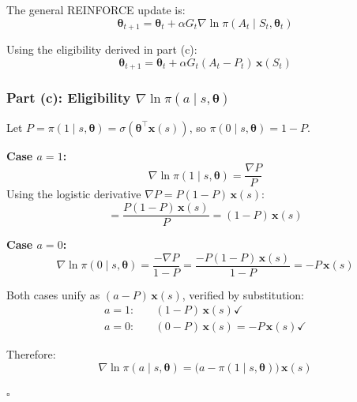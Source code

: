 \documentclass{article}
\begin{document}
The general REINFORCE update is:
\[
\boldsymbol{\theta}_{t+1} = \boldsymbol{\theta}_t + \alpha G_t \nabla \ln \pi(A_t \mid S_t, \boldsymbol{\theta}_t)
\]

Using the eligibility derived in part (c):
\[
\boldsymbol{\theta}_{t+1} = \boldsymbol{\theta}_t + \alpha G_t (A_t - P_t)\,\mathbf{x}(S_t)
\]

\subsubsection*{Part (c): Eligibility $\nabla \ln \pi(a \mid s, \boldsymbol{\theta})$}

Let $P = \pi(1 \mid s, \boldsymbol{\theta}) = \sigma(\boldsymbol{\theta}^\top \mathbf{x}(s))$,
so $\pi(0 \mid s, \boldsymbol{\theta}) = 1 - P$.

\textbf{Case $a = 1$:}
\[
\nabla \ln \pi(1 \mid s, \boldsymbol{\theta})
= \frac{\nabla P}{P}
\]
Using the logistic derivative $\nabla P = P(1-P)\,\mathbf{x}(s)$:
\[
= \frac{P(1-P)\,\mathbf{x}(s)}{P} = (1 - P)\,\mathbf{x}(s)
\]

\textbf{Case $a = 0$:}
\[
\nabla \ln \pi(0 \mid s, \boldsymbol{\theta})
= \frac{-\nabla P}{1 - P}
= \frac{-P(1-P)\,\mathbf{x}(s)}{1-P} = -P\,\mathbf{x}(s)
\]

Both cases unify as $(a - P)\,\mathbf{x}(s)$, verified by substitution:
\begin{align*}
a = 1: &\quad (1 - P)\,\mathbf{x}(s) \checkmark \\
a = 0: &\quad (0 - P)\,\mathbf{x}(s) = -P\,\mathbf{x}(s) \checkmark
\end{align*}

Therefore:
\[
\boxed{\nabla \ln \pi(a \mid s, \boldsymbol{\theta}) = \bigl(a - \pi(1 \mid s, \boldsymbol{\theta})\bigr)\,\mathbf{x}(s)}
\]

\hfill$\square$
\end{document}
